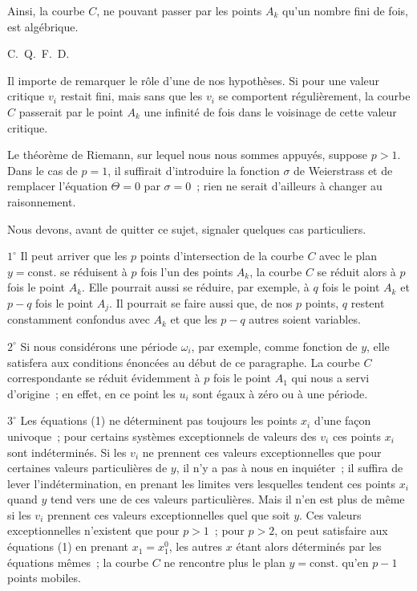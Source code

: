 \documentclass{article}
\begin{document}
Ainsi, la courbe $C$, ne pouvant passer par les points $A_{k}$ qu'un nombre fini de fois, est algébrique.

\hfill C.~Q.~F.~D.

Il importe de remarquer le rôle d'une de nos hypothèses. Si pour une valeur critique $v_{i}$ restait fini, mais sans que les $v_{i}$ se comportent régulièrement, la courbe $C$ passerait par le point $A_{k}$ une infinité de fois dans le voisinage de cette valeur critique.

Le théorème de Riemann, sur lequel nous nous sommes appuyés, suppose $p > 1$. Dans le cas de $p = 1$, il suffirait d'introduire la fonction $\sigma$ de Weierstrass et de remplacer l'équation $\Theta = 0$ par $\sigma = 0$~; rien ne serait d'ailleurs à changer au raisonnement.

Nous devons, avant de quitter ce sujet, signaler quelques cas particuliers.

$1^\circ$ Il peut arriver que les $p$ points d'intersection de la courbe $C$ avec le plan $y = \text{const.}$ se réduisent à $p$ fois l'un des points $A_{k}$, la courbe $C$ se réduit alors à $p$ fois le point $A_{k}$. Elle pourrait aussi se réduire, par exemple, à $q$ fois le point $A_{k}$ et $p - q$ fois le point $A_{j}$. Il pourrait se faire aussi que, de nos $p$ points, $q$ restent constamment confondus avec $A_{k}$ et que les $p - q$ autres soient variables.

$2^\circ$ Si nous considérons une période $\omega_{i}$, par exemple, comme fonction de $y$, elle satisfera aux conditions énoncées au début de ce paragraphe. La courbe $C$ correspondante se réduit évidemment à $p$ fois le point $A_{1}$ qui nous a servi d'origine~; en effet, en ce point les $u_{i}$ sont égaux à zéro ou à une période.

$3^\circ$ Les équations (1) ne déterminent pas toujours les points $x_{i}$ d'une façon univoque~; pour certains systèmes exceptionnels de valeurs des $v_{i}$ ces points $x_{i}$ sont indéterminés. Si les $v_{i}$ ne prennent ces valeurs exceptionnelles que pour certaines valeurs particulières de $y$, il n'y a pas à nous en inquiéter~; il suffira de lever l'indétermination, en prenant les limites vers lesquelles tendent ces points $x_{i}$ quand $y$ tend vers une de ces valeurs particulières. Mais il n'en est plus de même si les $v_{i}$ prennent ces valeurs exceptionnelles quel que soit $y$. Ces valeurs exceptionnelles n'existent que pour $p > 1$~; pour $p > 2$, on peut satisfaire aux équations (1) en prenant $x_{1} = x_{1}^{0}$, les autres $x$ étant alors déterminés par les équations mêmes~; la courbe $C$ ne rencontre plus le plan $y = \text{const.}$ qu'en $p - 1$ points mobiles.
\end{document}
